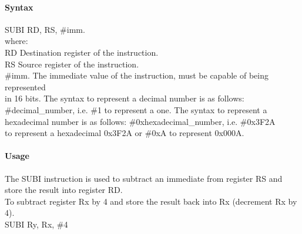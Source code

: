 \documentclass[12pt]{article}
\begin{document}
    \paragraph{Syntax}
    \begin{flushleft}
    SUBI RD, RS, \#imm.\\
    \vspace{1em}        %
    where:\\
    \vspace{1em}
    RD  \hspace{3.6em} Destination register of the instruction.\\
    \vspace{1em}
    RS  \hspace{3.85em} Source register of the instruction.\\
    \vspace{1em}
    \#imm.  \hspace{1.8em} The immediate value of the instruction, must be capable of being represented\\             \hspace{5.4em} in 16 bits. The syntax to represent a decimal number is as follows:\\
            \hspace{5.4em} \#decimal\_number, i.e. \#1 to represent a one. The syntax to represent a\\
            \hspace{5.4em} hexadecimal number is as follows: \#0xhexadecimal\_number, i.e. \#0x3F2A \\
            \hspace{5.4em} to represent a hexadecimal 0x3F2A or \#0xA to represent 0x000A.\\
    \end{flushleft}
    
    \paragraph{Usage}
    \begin{flushleft}
    The SUBI instruction is used to subtract an immediate from register RS and store the result into register RD.\\    
    \vspace{1em}
    To subtract register Rx by 4 and store the result back into Rx (decrement Rx by 4).\\
    \vspace{1em}
    SUBI Ry, Rx, \#4
    \end{flushleft}
    
\end{document}
